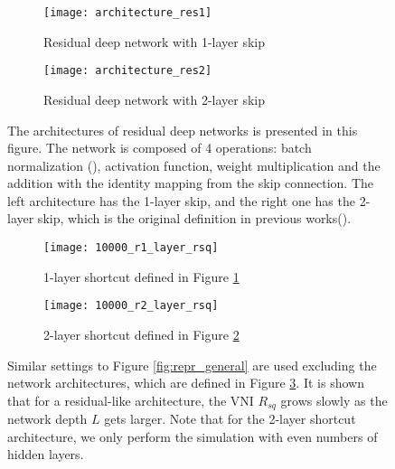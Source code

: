 \begin{figure}[h]
    \centering
    \newcommand{\myWidth}{0.48\textwidth}
    \begin{subfigure}{\myWidth}
      \centering
      \caption{Residual deep network with 1-layer skip}
      \texttt{[image: architecture\_res1]}
      \label{fig:resnet_def1}
    \end{subfigure}
    \begin{subfigure}{\myWidth}
      \centering
      \caption{Residual deep network with 2-layer skip}
      \texttt{[image: architecture\_res2]}
      \label{fig:resnet_def2}
    \end{subfigure}%
    \caption[The architectures of residual deep networks]{
        The architectures of residual deep networks is presented in this figure.
        The network is composed of 4 operations: batch normalization (\cite{batchnorm}), activation
        function, weight multiplication and the addition with the identity mapping from the skip 
        connection.
        The left architecture has the 1-layer skip, and the right one has the 2-layer skip, which is
        the original definition in previous works(\cite{resnet2}).
    }
    \label{fig:resnet_def}
\end{figure}

\begin{figure}[h]
    \centering
    \newcommand{\myWidth}{0.9\textwidth}
    \begin{subfigure}{\myWidth}
      \centering
      \caption{1-layer shortcut defined in Figure \ref{fig:resnet_def1}}
      \texttt{[image: 10000\_r1\_layer\_rsq]}
      \label{fig:repr_residual_a}
    \end{subfigure}
    
    \begin{subfigure}{\myWidth}
      \centering
      \caption{2-layer shortcut defined in Figure \ref{fig:resnet_def2}}
      \texttt{[image: 10000\_r2\_layer\_rsq]}
      \label{fig:repr_residual_b}
    \end{subfigure}%
    \caption[The initial VNI $R_{sq}$ of residual networks.]{
    Similar settings to Figure \ref{fig:repr_general} are used excluding the network architectures,
    which are defined in Figure \ref{fig:resnet_def}.
    It is shown that for a residual-like architecture, the VNI $R_{sq}$ grows slowly as the network
    depth $L$ gets larger.
    Note that for the 2-layer shortcut architecture, we only perform the simulation with even numbers
    of hidden layers.}
    \label{fig:repr_residual}
\end{figure}


